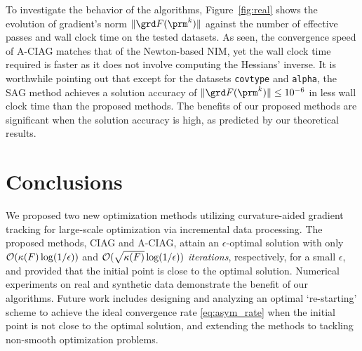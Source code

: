 \documentclass[smallextended]{svjour3}       %
\begin{document}
To investigate the behavior of the algorithms, Figure~\ref{fig:real}
shows the evolution of gradient's norm $\| \grd F( \prm^k ) \|$ 
against the number of effective passes and wall clock time
on the tested datasets.
As seen, the convergence speed of {\sf A-CIAG} matches that of the Newton-based
{\sf NIM}, yet the wall clock time required is faster
as it does not involve computing the Hessians' inverse.
It is worthwhile pointing out that except for 
the datasets \texttt{covtype} and 
\texttt{alpha}, 
the {\sf SAG} method achieves a solution accuracy of 
$\| \grd F( \prm^k ) \| \leq 10^{-6}$ in less wall clock time than
the proposed methods. 
The benefits of our proposed methods are significant when
the solution accuracy is high, as predicted by our theoretical results.\vspace{-.2cm}

\section{Conclusions}
We proposed two new optimization methods utilizing 
curvature-aided gradient tracking for large-scale optimization via incremental
data processing. 
The proposed methods, {\sf CIAG} and {\sf A-CIAG}, attain an $\epsilon$-optimal solution
with only ${\cal O}( {\kappa(F)} \log (1/\epsilon))$ and ${\cal O}( \sqrt{\kappa(F)} \log (1/\epsilon))$ \emph{iterations}, respectively,  
for a small $\epsilon$, and provided that the initial point is close to the optimal solution.
Numerical experiments on real and synthetic data demonstrate the benefit of our algorithms.
Future work includes designing and analyzing an optimal `re-starting' scheme to achieve the ideal convergence rate \eqref{eq:asym_rate} when the initial point is not close to the optimal solution, and extending the methods to tackling non-smooth optimization problems.




\appendix
\end{document}
